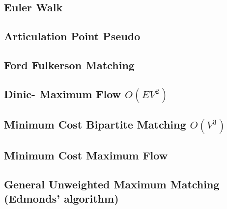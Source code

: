 \documentclass[12pt]{extarticle}
\begin{document}
\begin{multicols*}{2}
\subsection{Euler Walk} %


\subsection{Articulation Point Pseudo} %


% 

\subsection{Ford Fulkerson Matching} %



\subsection{Dinic- Maximum Flow $O(EV^2)$ } %


\subsection{Minimum Cost Bipartite Matching $O(V^3)$ } %


\subsection{Minimum Cost Maximum Flow } %


\subsection{General Unweighted Maximum Matching (Edmonds' algorithm)}



\end{multicols*}
\end{document}
